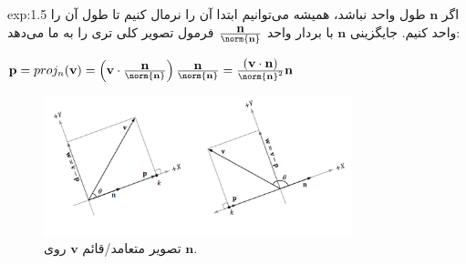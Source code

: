 {\begin{spacing}{1.5}
\begin{example}{exp:1.5}
            اگر $\textbf{n}$ طول واحد نباشد، همیشه می‌توانیم ابتدا آن را نرمال کنیم تا طول آن را واحد کنیم.
            جایگزینی $\textbf{n}$ با بردار واحد $\frac{\displaystyle\textbf{n}}{\norm{\textbf{n}}}$ فرمول تصویر کلی تری را به ما می‌دهد:

            \begin{center}
                $\textbf{p}=proj_{n}(\textbf{v})=\left( \textbf{v}\cdot\frac{\displaystyle\textbf{n}}{\norm{\textbf{n}}} \right)\frac{\displaystyle\textbf{n}}{\norm{\textbf{n}}}=\frac{\displaystyle(\textbf{v}\cdot\textbf{n})}{\norm{\textbf{n}}^2}\textbf{n}$
            \end{center}

            \begin{figure}[H]
                \centering
                \setlength{\belowcaptionskip}{-10pt}
                \includegraphics[width=0.8\textwidth]{Images/4/1/4.Session.1.1.10}
                \caption{تصویر متعامد/قائم $\textbf{v}$ روی $\textbf{n}$. \textbf{\vspace{10pt}}}
                \label{fig:4.Session.1.1.10}
            \end{figure}
        \end{example}
    \end{spacing}
}

\textbf{\vspace{-10pt}}

